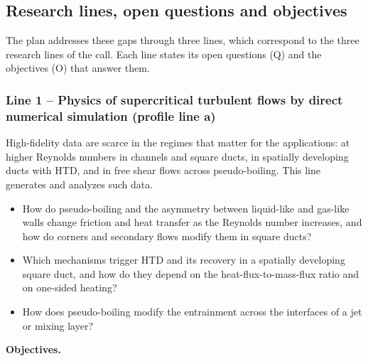 \documentclass[11pt]{article}
\begin{document}
\subsection{Research lines, open questions and objectives}\label{sec:lines}
The plan addresses these gaps through three lines, which correspond to the three research
lines of the call. Each line states its open questions (Q) and the objectives (O) that
answer them.

\subsubsection*{Line 1 -- Physics of supercritical turbulent flows by direct numerical
simulation (profile line a)}
High-fidelity data are scarce in the regimes that matter for the applications: at higher
Reynolds numbers in channels and square ducts, in spatially developing ducts with HTD, and in
free shear flows across pseudo-boiling. This line generates and analyzes such data.
\begin{itemize}
  \item[\textbf{Q1.1}] How do pseudo-boiling and the asymmetry between liquid-like and
  gas-like walls change friction and heat transfer as the Reynolds number increases, and
  how do corners and secondary flows modify them in square ducts?
  \item[\textbf{Q1.2}] Which mechanisms trigger HTD and its recovery in a spatially developing
  square duct, and how do they depend on the heat-flux-to-mass-flux ratio and on one-sided
  heating?
  \item[\textbf{Q1.3}] How does pseudo-boiling modify the entrainment across the interfaces
  of a jet or mixing layer?
\end{itemize}
\textbf{Objectives.}
\end{document}
